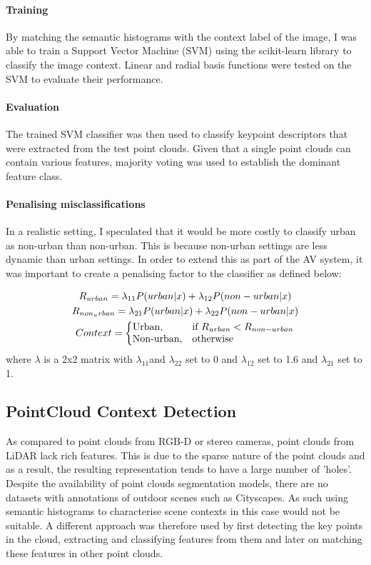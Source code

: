 \paragraph{Training}By matching the semantic histograms with the context label of the image, I was able to train a Support Vector Machine (SVM) using the scikit-learn library to classify the image context. Linear and radial basis functions were tested on the SVM to evaluate their performance.
\paragraph{Evaluation}The trained SVM classifier was then used to classify keypoint descriptors that were extracted from the test point clouds. Given that a single point clouds can contain various features, majority voting was used to establish the dominant feature class. 

\paragraph{Penalising misclassifications}In a realistic setting, I speculated that it would be more costly to classify urban as non-urban than non-urban. This is because non-urban settings are less dynamic than urban settings. In order to extend this as part of the AV system, it was important to create a penalising factor to the classifier as defined below: 

\noindent


\begin{gather*}
	R_{urban} = \lambda _{11}P(urban |x) + \lambda _{12}P(non-urban|x)  \\ 
	R_{non_urban} = \lambda_{21}P(urban|x) + \lambda _{22}P(non-urban|x)\\ 
	Context=\left\{
		\begin{array}{@{}ll@{}}
		\text{Urban}, & \text{if}\ R_{urban} < R_{non-urban}  \\
		\text{Non-urban}, & \text{otherwise}
		\end{array}\right.
\end{gather*} 
where $\lambda $ is a 2x2 matrix with $\lambda_{11}$and $\lambda_{22}$ set to 0 and $\lambda_{12}$ set to 1.6 and $\lambda_{21}$ set to 1.





\subsection{PointCloud Context Detection}
As compared to point clouds from RGB-D or stereo cameras, point clouds from LiDAR lack rich features. This is due to the sparse nature of the point clouds and as a result, the resulting representation tends to have a large number of 'holes'. Despite the availability of point clouds segmentation models, there are no datasets with annotations of outdoor scenes such as Cityscapes. As such using semantic histograms to characterise scene contexts in this case would not be suitable.
A different approach was therefore used by first detecting the key points in the cloud, extracting and classifying features from them and later on matching these features in other point clouds.  

